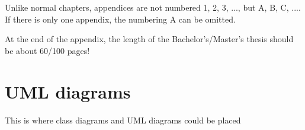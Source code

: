 \documentclass[12pt]{report}           %
\theoremstyle{thesis}        %
\begin{document}
	Unlike normal chapters, appendices are not numbered 1, 2, 3, ..., but A, B, C, .... If there is only one appendix, the numbering A can be omitted. 
	
	At the end of the appendix, the length of the Bachelor's/Master's thesis should be about 
	60/100 pages!
	\chapter{UML diagrams}
	\label{chap:anhang_b}
	
	\begin{center}
		This is where class diagrams and UML diagrams could be placed
	\end{center}
	
	\pagestyle{empty}
	
	\vspace*{6cm}
	\baselineskip=14pt
	\printbibheading
	\printbibliography[nottype=online, heading=subbibliography, title={Sources}]
	\printbibliography[type=online, heading=subbibliography, title={Online sources}]
	
\end{document}
